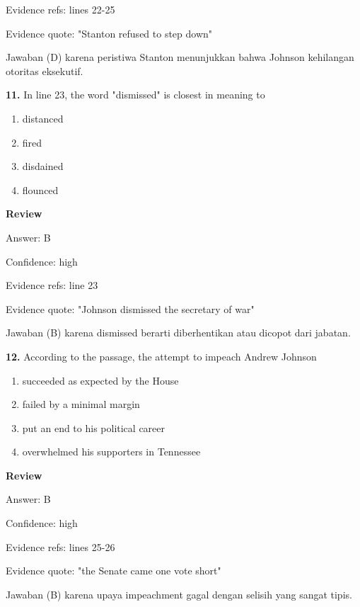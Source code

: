 \documentclass[12pt]{article}
\begin{document}
Evidence refs: lines 22-25\par
Evidence quote: "Stanton refused to step down"\par
Jawaban (D) karena peristiwa Stanton menunjukkan bahwa Johnson kehilangan otoritas eksekutif.\par
\endgroup
\par
\vspace{0.25\baselineskip}
\noindent\textbf{11.} In line 23, the word "dismissed" is closest in meaning to
\begin{enumerate}[label=(\Alph*),leftmargin=*,itemsep=0.2em]
\item distanced
\item fired
\item disdained
\item flounced
\end{enumerate}
\par
\begingroup
\setlength{\parskip}{0pt}
\setlength{\parindent}{0pt}
\textbf{Review}\par
Answer: B\par
Confidence: high\par
Evidence refs: line 23\par
Evidence quote: "Johnson dismissed the secretary of war"\par
Jawaban (B) karena dismissed berarti diberhentikan atau dicopot dari jabatan.\par
\endgroup
\par
\vspace{0.25\baselineskip}
\noindent\textbf{12.} According to the passage, the attempt to impeach Andrew Johnson
\begin{enumerate}[label=(\Alph*),leftmargin=*,itemsep=0.2em]
\item succeeded as expected by the House
\item failed by a minimal margin
\item put an end to his political career
\item overwhelmed his supporters in Tennessee
\end{enumerate}
\par
\begingroup
\setlength{\parskip}{0pt}
\setlength{\parindent}{0pt}
\textbf{Review}\par
Answer: B\par
Confidence: high\par
Evidence refs: lines 25-26\par
Evidence quote: "the Senate came one vote short"\par
Jawaban (B) karena upaya impeachment gagal dengan selisih yang sangat tipis.\par
\endgroup
\par
\vspace{0.25\baselineskip}
\end{document}
